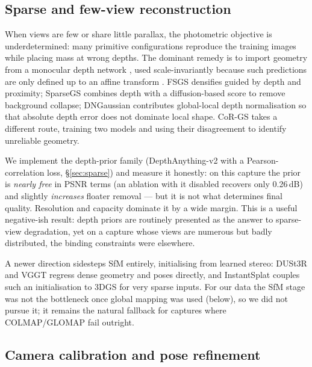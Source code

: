 \subsection{Sparse and few-view reconstruction}

When views are few or share little parallax, the photometric objective is
underdetermined: many primitive configurations reproduce the training images while
placing mass at wrong depths. The dominant remedy is to import geometry from a
monocular depth network \cite{ranftl2022midas,yang2024depthanythingv2}, used
scale-invariantly because such predictions are only defined up to an affine
transform \cite{eigen2014depth}. FSGS \cite{zhu2024fsgs} densifies guided by depth
and proximity; SparseGS \cite{xiong2024sparsegs} combines depth with a
diffusion-based score to remove background collapse; DNGaussian
\cite{li2024dngaussian} contributes global-local depth normalisation so that
absolute depth error does not dominate local shape. CoR-GS \cite{zhang2024corgs}
takes a different route, training two models and using their disagreement to
identify unreliable geometry.

We implement the depth-prior family (DepthAnything-v2 with a Pearson-correlation
loss, \S\ref{sec:sparse}) and measure it honestly: on this capture the prior is
\emph{nearly free} in PSNR terms (an ablation with it disabled recovers only
0.26\,dB) and slightly \emph{increases} floater removal — but it is not what
determines final quality. Resolution and capacity dominate it by a wide margin.
This is a useful negative-ish result: depth priors are routinely presented as the
answer to sparse-view degradation, yet on a capture whose views are numerous but
badly distributed, the binding constraints were elsewhere.

A newer direction sidesteps SfM entirely, initialising from learned stereo:
DUSt3R \cite{wang2024dust3r} and VGGT \cite{wang2025vggt} regress dense geometry
and poses directly, and InstantSplat \cite{fan2024instantsplat} couples such an
initialisation to 3DGS for very sparse inputs. For our data the SfM stage was not
the bottleneck once global mapping was used (below), so we did not pursue it;
it remains the natural fallback for captures where COLMAP/GLOMAP fail outright.

\subsection{Camera calibration and pose refinement}

